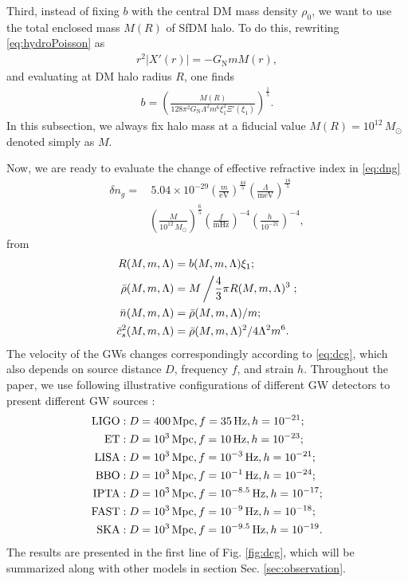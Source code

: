 \documentclass[aps,prd,twocolumn,10pt,groupedaddress]{revtex4-1}
\begin{document}
Third, instead of fixing $b$ with the central DM mass density $\rho_0$, we want to use the total enclosed mass $M(R)$ of SfDM halo. To do this, rewriting \eqref{eq:hydroPoisson} as
\begin{align}\label{eq:master}
r^2|X'(r)|=-G_\mathrm{N}mM(r),
\end{align}
and evaluating at DM halo radius $R$, one finds
\begin{align}\label{eq:b}
b=\left(\frac{M(R)}{128\pi^2G_\mathrm{N}\Lambda^2m^6\xi_1^2\Xi'(\xi_1)}\right)^\frac15.
\end{align}
In this subsection, we always fix halo mass at a fiducial value $M(R)=10^{12}\,M_\odot$ denoted simply as $M$.

Now, we are ready to evaluate the change of effective refractive index in \eqref{eq:dng}
\begin{align}
\delta n_g = &\,5.04\times10^{-29}\left(\frac{m}{\mathrm{eV}}\right)^\frac{44}{5}
\left(\frac{\Lambda}{\mathrm{meV}}\right)^\frac{18}{5}\nonumber\\
&\left(\frac{M}{10^{12}\,M_\odot}\right)^\frac65\left(\frac{f}{\mathrm{mHz}}\right)^{-4}\left(\frac{h}{10^{-21}}\right)^{-4},
\end{align}
from
\begin{align}
R(M,m,\Lambda)&=b(M,m,\Lambda)\xi_1;\\
\bar{\rho}(M,m,\Lambda)&=M\left/\frac43\pi R(M,m,\Lambda)^3\right.;\\
\bar{n}(M,m,\Lambda)&=\bar{\rho}(M,m,\Lambda)/m;\\
\bar{c}_s^2(M,m,\Lambda)&=\bar{\rho}(M,m,\Lambda)^2/4\Lambda^2m^6.
\end{align}
The velocity of the GWs changes correspondingly according to \eqref{eq:dcg}, which also depends on source distance $D$, frequency $f$, and strain $h$. Throughout the paper, we use following illustrative configurations \cite{Chen:2016isk} of different GW detectors to present different GW sources :
\begin{align}
\hbox{LIGO} &: D=400\,\mathrm{Mpc}, f=35\,\mathrm{Hz}, h=10^{-21};\label{eq:LIGO}\\
\hbox{ET}   &: D=10^3\,\mathrm{Mpc}, f=10\,\mathrm{Hz}, h=10^{-23};\label{eq:ET}\\
\hbox{LISA} &: D=10^3\,\mathrm{Mpc}, f=10^{-3}\,\mathrm{Hz}, h=10^{-21};\label{eq:LISA}\\
\hbox{BBO}  &: D=10^3\,\mathrm{Mpc}, f=10^{-1}\,\mathrm{Hz}, h=10^{-24};\label{eq:BBO}\\
\hbox{IPTA} &: D=10^3\,\mathrm{Mpc}, f=10^{-8.5}\,\mathrm{Hz}, h=10^{-17};\label{eq:IPTA}\\
\hbox{FAST} &: D=10^3\,\mathrm{Mpc}, f=10^{-9}\,\mathrm{Hz}, h=10^{-18};\label{eq:FAST}\\
\hbox{SKA}  &: D=10^3\,\mathrm{Mpc}, f=10^{-9.5}\,\mathrm{Hz}, h=10^{-19}\label{eq:SKA}.
\end{align}
The results are presented in the first line of Fig. \ref{fig:dcg}, which will be summarized along with other models in section Sec. \ref{sec:observation}.
\end{document}
